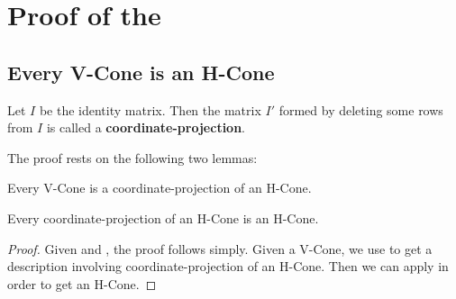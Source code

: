\chapter{Proof of the \MWT}

\section{Every V-Cone is an H-Cone}

\begin{Def}
	Let $I$ be the identity matrix.  Then the matrix $I'$ formed by deleting some rows from $I$ is called a \textbf{coordinate-projection}.
\end{Def}

The proof rests on the following two lemmas:

\begin{Lemma}\label{vconelift}
	 Every V-Cone is a coordinate-projection of an H-Cone.
\end{Lemma}

\begin{Lemma}\label{hconeproject}
	 Every coordinate-projection of an H-Cone is an H-Cone.
\end{Lemma}

\begin{proof}
	Given  and , the proof follows simply.  Given a V-Cone, we use  to get a description involving coordinate-projection of an H-Cone.  Then we can apply  in order to get an H-Cone.
\end{proof}

